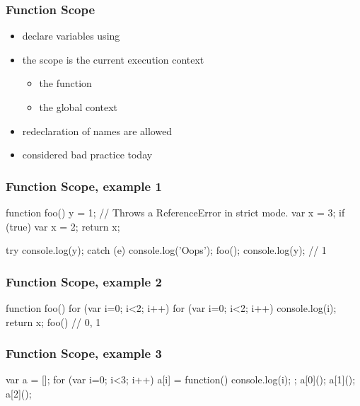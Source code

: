 \begin{frame}[fragile] \frametitle{Function Scope}
\begin{itemize}
  \item declare variables using 
  \item the scope is the current execution context
  \begin{itemize}
    \item the function
    \item the global context
  \end{itemize}
  \item redeclaration of names are allowed
  \item considered bad practice today
\end{itemize}
\end{frame}

\begin{frame}[fragile] \frametitle{Function Scope, example 1}

\begin{CodeBox}{}
function foo() {
  y = 1; // Throws a ReferenceError in strict mode.
  var x = 3;
  if (true) {
    var x = 2;
  }
  return x;
}

try {
  console.log(y);
} catch (e) {  console.log('Oops');  }
foo();
console.log(y); // 1
\end{CodeBox}
\end{frame}

\begin{frame}[fragile] \frametitle{Function Scope, example 2}

\begin{CodeBox}{}
function foo() {
  for (var i=0; i<2; i++) {
    for (var i=0; i<2; i++) {
      console.log(i);
    }
  }
  return x;
}
foo()  // 0, 1
\end{CodeBox}
\end{frame}

\begin{frame}[fragile] \frametitle{Function Scope, example 3}

\begin{CodeBox}{}
var a = [];
for (var i=0; i<3; i++) {
  a[i] = function() { console.log(i); };
}
a[0]();
a[1]();
a[2]();
\end{CodeBox}
\end{frame}

